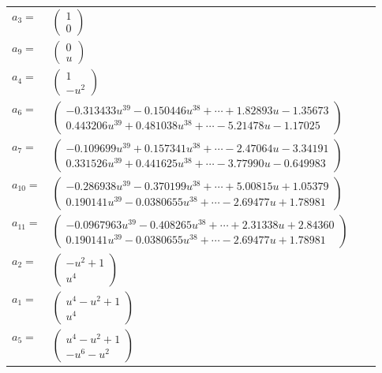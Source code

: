 \documentclass[1p]{elsarticle_modified}
\theoremstyle{definition}
\begin{document}
\begin{tabular}{m{7pt} m{180pt} m{7pt} m{180pt} }
\flushright $a_{3}=$&$\begin{pmatrix}1\\0\end{pmatrix}$ \\
\flushright $a_{9}=$&$\begin{pmatrix}0\\u\end{pmatrix}$ \\
\flushright $a_{4}=$&$\begin{pmatrix}1\\- u^2\end{pmatrix}$ \\
\flushright $a_{6}=$&$\begin{pmatrix}-0.313433 u^{39}-0.150446 u^{38}+\cdots+1.82893 u-1.35673\\0.443206 u^{39}+0.481038 u^{38}+\cdots-5.21478 u-1.17025\end{pmatrix}$ \\
\flushright $a_{7}=$&$\begin{pmatrix}-0.109699 u^{39}+0.157341 u^{38}+\cdots-2.47064 u-3.34191\\0.331526 u^{39}+0.441625 u^{38}+\cdots-3.77990 u-0.649983\end{pmatrix}$ \\
\flushright $a_{10}=$&$\begin{pmatrix}-0.286938 u^{39}-0.370199 u^{38}+\cdots+5.00815 u+1.05379\\0.190141 u^{39}-0.0380655 u^{38}+\cdots-2.69477 u+1.78981\end{pmatrix}$ \\
\flushright $a_{11}=$&$\begin{pmatrix}-0.0967963 u^{39}-0.408265 u^{38}+\cdots+2.31338 u+2.84360\\0.190141 u^{39}-0.0380655 u^{38}+\cdots-2.69477 u+1.78981\end{pmatrix}$ \\
\flushright $a_{2}=$&$\begin{pmatrix}- u^2+1\\u^4\end{pmatrix}$ \\
\flushright $a_{1}=$&$\begin{pmatrix}u^4- u^2+1\\u^4\end{pmatrix}$ \\
\flushright $a_{5}=$&$\begin{pmatrix}u^4- u^2+1\\- u^6- u^2\end{pmatrix}$ \\

\end{tabular}
\end{document}
